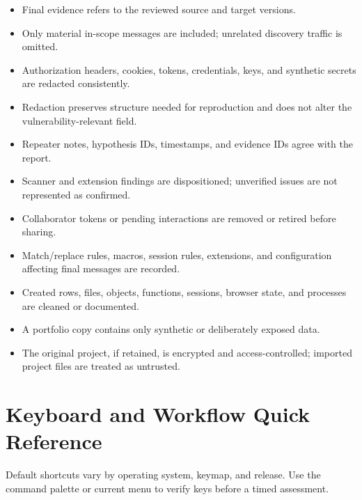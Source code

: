 \documentclass[11pt]{article}
\begin{document}
\begin{itemize}[label=$\square$]
  \item Final evidence refers to the reviewed source and target versions.
  \item Only material in-scope messages are included; unrelated discovery traffic is omitted.
  \item Authorization headers, cookies, tokens, credentials, keys, and synthetic secrets are redacted consistently.
  \item Redaction preserves structure needed for reproduction and does not alter the vulnerability-relevant field.
  \item Repeater notes, hypothesis IDs, timestamps, and evidence IDs agree with the report.
  \item Scanner and extension findings are dispositioned; unverified issues are not represented as confirmed.
  \item Collaborator tokens or pending interactions are removed or retired before sharing.
  \item Match/replace rules, macros, session rules, extensions, and configuration affecting final messages are recorded.
  \item Created rows, files, objects, functions, sessions, browser state, and processes are cleaned or documented.
  \item A portfolio copy contains only synthetic or deliberately exposed data.
  \item The original project, if retained, is encrypted and access-controlled; imported project files are treated as untrusted.
\end{itemize}

\section{Keyboard and Workflow Quick Reference}

Default shortcuts vary by operating system, keymap, and release. Use the command
palette or current menu to verify keys before a timed assessment.
\end{document}
